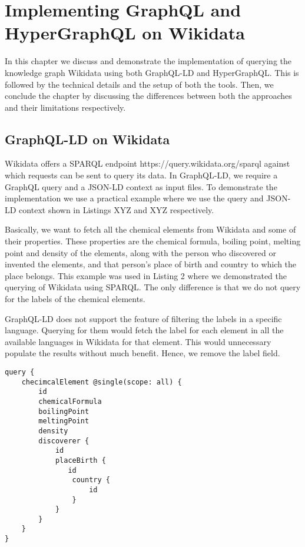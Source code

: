 \chapter{Implementing GraphQL and HyperGraphQL on Wikidata}

In this chapter we discuss and demonstrate the implementation of querying the knowledge graph Wikidata using both GraphQL-LD and HyperGraphQL. This is followed by the technical details and the setup of both the tools. Then, we conclude the chapter by discussing the differences between both the approaches and their limitations respectively.

\section{GraphQL-LD on Wikidata}

Wikidata offers a SPARQL endpoint https://query.wikidata.org/sparql against which requests can be sent to query its data. In GraphQL-LD, we require a GraphQL query and a JSON-LD context as input files. To demonstrate the implementation we use a practical example where we use the query and JSON-LD context shown in Listings XYZ and XYZ respectively. 

Basically, we want to fetch all the chemical elements from Wikidata and some of their properties. These properties are the chemical formula, boiling point, melting point and density of the elements, along with the person who discovered or invented the elements, and that person’s place of birth and country to which the place belongs. This example was used in Listing 2 where we demonstrated the querying of Wikidata using SPARQL. The only difference is that we do not query for the labels of the chemical elements.

GraphQL-LD does not support the feature of filtering the labels in a specific language. Querying for them would fetch the label for each element in all the available languages in Wikidata for that element. This would unnecessary populate the results without much benefit. Hence, we remove the label field.

\begin{minipage}{\linewidth}
\begin{lstlisting}[label=listing:listing17, caption={Query}]
query {
    checimcalElement @single(scope: all) {
        id 
        chemicalFormula
        boilingPoint
        meltingPoint
        density
        discoverer {
            id
            placeBirth {
               id
                country {
					id
				}
            }
        }
    }
}
\end{lstlisting}
\end{minipage}

